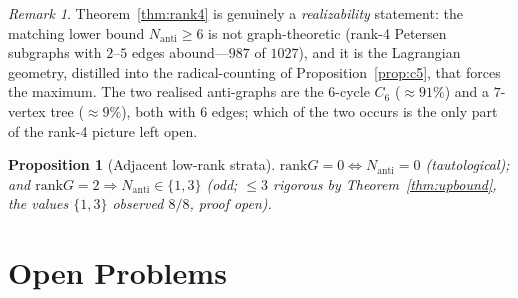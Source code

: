 \documentclass[11pt,a4paper]{article}
\newtheorem{proposition}[theorem]{Proposition}
\theoremstyle{remark}
\newtheorem{remark}[theorem]{Remark}
\newcommand{\rank}{\mathrm{rank}}
\newcommand{\Nanti}{N_{\mathrm{anti}}}
\begin{document}
\begin{remark}\label{rem:lowbound}
Theorem~\ref{thm:rank4} is genuinely a \emph{realizability} statement: the matching
lower bound $\Nanti\ge6$ is not graph-theoretic (rank-4 Petersen subgraphs with
$2$--$5$ edges abound---$987$ of $1027$), and it is the Lagrangian geometry, distilled
into the radical-counting of Proposition~\ref{prop:c5}, that forces the maximum. The
two realised anti-graphs are the $6$-cycle $C_6$ ($\approx91\%$) and a $7$-vertex tree
($\approx9\%$), both with $6$ edges; which of the two occurs is the only part of the
rank-4 picture left open.
\end{remark}

\begin{proposition}[Adjacent low-rank strata]\label{prop:lowrank}
$\rank G=0\Leftrightarrow\Nanti=0$ (tautological); and $\rank G=2\Rightarrow
\Nanti\in\{1,3\}$ (odd; $\le3$ rigorous by Theorem~\ref{thm:upbound}, the values
$\{1,3\}$ observed $8/8$, proof open).
\end{proposition}

\section{Open Problems}\label{sec:open}
\end{document}
